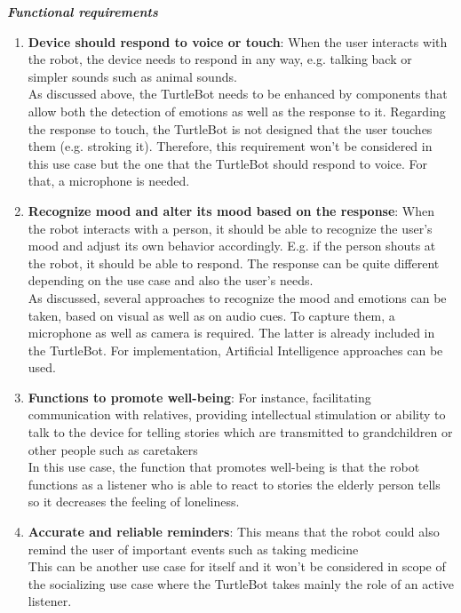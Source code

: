 \documentclass[plainarticle,zihtitle,english,final,hyperref,utf8]{zihpub}
\begin{document}
\textbf{\textit{Functional requirements}}
\begin{enumerate}
    \item \textbf{Device should respond to voice or touch}: When the user interacts with the robot, the device needs to respond in any way, e.g. talking back or simpler sounds such as animal sounds.\\
    \newline
    As discussed above, the TurtleBot needs to be enhanced by components that allow both the detection of emotions as well as the response to it. Regarding the response to touch, the TurtleBot is not designed that the user touches them (e.g. stroking it). Therefore, this requirement won't be considered in this use case but the one that the TurtleBot should respond to voice. For that, a microphone is needed.
    \item \textbf{Recognize mood and alter its mood based on the response}: When the robot interacts with a person, it should be able to recognize the user's mood and adjust its own behavior accordingly. E.g. if the person shouts at the robot, it should be able to respond. The response can be quite different depending on the use case and also the user's needs.\\
    \newline
    As discussed, several approaches to recognize the mood and emotions can be taken, based on visual as well as on audio cues. To capture them, a microphone as well as camera is required. The latter is already included in the TurtleBot. For implementation, Artificial Intelligence approaches can be used.
    \item \textbf{Functions to promote well-being}: For instance, facilitating communication with relatives, providing intellectual stimulation or ability to talk to the device for telling stories which are transmitted to grandchildren or other people such as caretakers\\
    \newline
    In this use case, the function that promotes well-being is that the robot functions as a listener who is able to react to stories the elderly person tells so it decreases the feeling of loneliness.
    \item \textbf{Accurate and reliable reminders}: This means that the robot could also remind the user of important events such as taking medicine\\
    \newline
    This can be another use case for itself and it won't be considered in scope of the socializing use case where the TurtleBot takes mainly the role of an active listener.
\end{enumerate}
\end{document}
